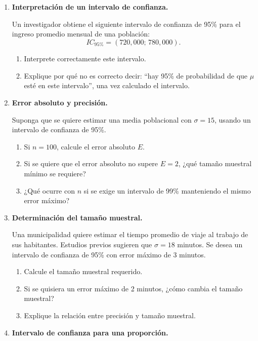 \documentclass[11pt]{article}
\begin{document}
\begin{enumerate}[label=\textbf{Ejercicio \arabic*.}, leftmargin=*]
    \item \textbf{Interpretación de un intervalo de confianza.}
    
    Un investigador obtiene el siguiente intervalo de confianza de 95\% para el ingreso promedio mensual de una población:
    \[
        IC_{95\%}=(720{,}000;\, 780{,}000).
    \]
    \begin{enumerate}[label=\alph*)]
        \item Interprete correctamente este intervalo.
        \item Explique por qué no es correcto decir: ``hay 95\% de probabilidad de que $\mu$ esté en este intervalo'', una vez calculado el intervalo.
    \end{enumerate}

    \item \textbf{Error absoluto y precisión.}
    
    Suponga que se quiere estimar una media poblacional con $\sigma=15$, usando un intervalo de confianza de 95\%.
    \begin{enumerate}[label=\alph*)]
        \item Si $n=100$, calcule el error absoluto $E$.
        \item Si se quiere que el error absoluto no supere $E=2$, ¿qué tamaño muestral mínimo se requiere?
        \item ¿Qué ocurre con $n$ si se exige un intervalo de 99\% manteniendo el mismo error máximo?
    \end{enumerate}

    \item \textbf{Determinación del tamaño muestral.}
    
    Una municipalidad quiere estimar el tiempo promedio de viaje al trabajo de sus habitantes. Estudios previos sugieren que $\sigma=18$ minutos. Se desea un intervalo de confianza de 95\% con error máximo de 3 minutos.
    \begin{enumerate}[label=\alph*)]
        \item Calcule el tamaño muestral requerido.
        \item Si se quisiera un error máximo de 2 minutos, ¿cómo cambia el tamaño muestral?
        \item Explique la relación entre precisión y tamaño muestral.
    \end{enumerate}

    \item \textbf{Intervalo de confianza para una proporción.}
    

\end{enumerate}
\end{document}
